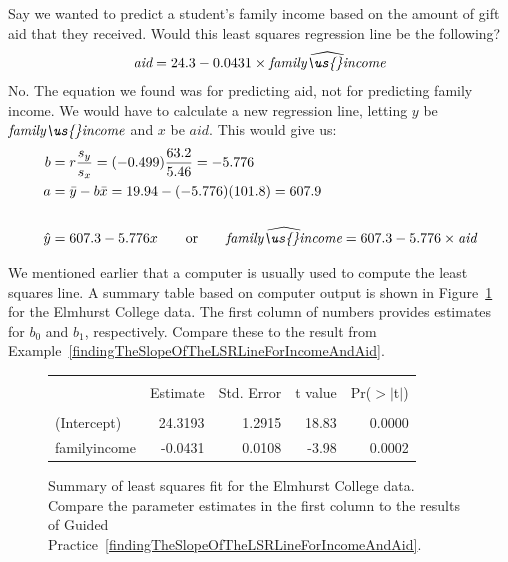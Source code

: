 \begin{examplewrap}
\begin{nexample}{Say we wanted to predict a student's family income based on the amount of gift aid that they received.  Would this least squares regression line be the following?
\begin{align*}
\textit{aid} = 24.3 - 0.0431\times \widehat{\textit{family\us{}income}}
\end{align*}}
No.  The equation we found was for predicting aid, not for predicting family income.  We would have to calculate a new regression line, letting $y$ be $\textit{family\us{}income}$ and $x$ be $\textit{aid}$.  This would give us:
\begin{align*}
b &= r\frac{s_y}{s_x} = (-0.499)\frac{63.2}{5.46} = -5.776 \\
a & = \bar{y} - b\bar{x} = 19.94 - (-5.776)(101.8) = 607.9\\
\\
\hat{y}&=607.3 - 5.776x
	\qquad\text{or}\qquad
	\widehat{\textit{family\us{}income}} = 607.3 - 5.776\times \textit{aid}
\end{align*}

\end{nexample}
\end{examplewrap} 


We mentioned earlier that a computer is usually used to compute the least squares line. A summary table based on computer output is shown in Figure~\ref{rOutputForIncomeAidLSRLine} for the Elmhurst College data. The first column of numbers provides estimates for ${b}_0$ and ${b}_1$, respectively. Compare these to the result from Example~\ref{findingTheSlopeOfTheLSRLineForIncomeAndAid}.

\begin{figure}[ht]
\centering
\begin{tabular}{l rrrr}
  \hline
  \vspace{-3.7mm} & & & & \\
 & Estimate & Std. Error & t value & Pr($>$$|$t$|$) \\ 
  \hline
  \vspace{-3.6mm} & & & & \\
(Intercept) & 24.3193 & 1.2915 & 18.83 & 0.0000 \\ 
family\us{}income & -0.0431 & 0.0108 & -3.98 & 0.0002 \\ 
  \hline
\end{tabular}
\caption{Summary of least squares fit for the Elmhurst College data. Compare the parameter estimates in the first column to the results of Guided Practice~\ref{findingTheSlopeOfTheLSRLineForIncomeAndAid}.}
\label{rOutputForIncomeAidLSRLine}
\end{figure}

